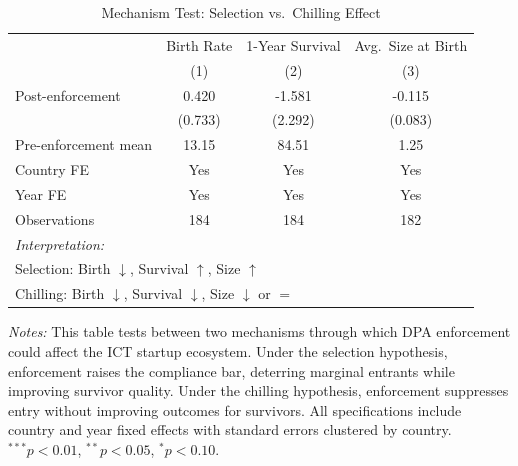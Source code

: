 \begin{table}[t]
\centering
\caption{Mechanism Test: Selection vs.\ Chilling Effect}
\label{tab:mechanism}
\begin{tabular}{lccc}
\hline\hline
 & Birth Rate & 1-Year Survival & Avg.\ Size at Birth \\
 & (1) & (2) & (3) \\
\hline
Post-enforcement & 0.420 & -1.581 & -0.115 \\
 & (0.733) & (2.292) & (0.083) \\
\hline
Pre-enforcement mean & 13.15 & 84.51 & 1.25 \\
Country FE & Yes & Yes & Yes \\
Year FE & Yes & Yes & Yes \\
Observations & 184 & 184 & 182 \\
\hline
\multicolumn{4}{l}{\textit{Interpretation:}} \\
\multicolumn{4}{l}{Selection: Birth $\downarrow$, Survival $\uparrow$, Size $\uparrow$} \\
\multicolumn{4}{l}{Chilling: Birth $\downarrow$, Survival $\downarrow$, Size $\downarrow$ or $=$} \\
\hline\hline
\end{tabular}
\par\vspace{0.3em}\begin{flushleft}\small
\textit{Notes:} This table tests between two mechanisms through which DPA enforcement could affect the ICT startup ecosystem. Under the selection hypothesis, enforcement raises the compliance bar, deterring marginal entrants while improving survivor quality. Under the chilling hypothesis, enforcement suppresses entry without improving outcomes for survivors. All specifications include country and year fixed effects with standard errors clustered by country. $^{***}p<0.01$, $^{**}p<0.05$, $^{*}p<0.10$.
\end{flushleft}
\end{table}

